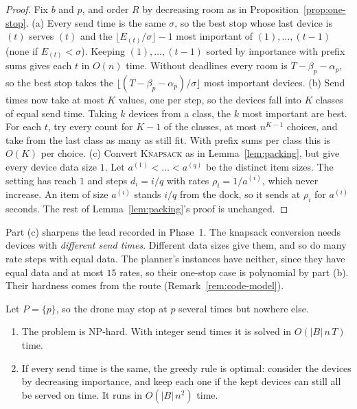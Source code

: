 \begin{proof}
Fix $b$ and $p$, and order $R$ by decreasing room as in
Proposition~\ref{prop:one-stop}. (a) Every send time is the same $\sigma$,
so the best stop whose last device is $(t)$ serves $(t)$ and the
$\lfloor E_{(t)}/\sigma\rfloor-1$ most important of $(1),\dots,(t-1)$ (none
if $E_{(t)}<\sigma$). Keeping $(1),\dots,(t-1)$ sorted by importance with
prefix sums gives each $t$ in $O(n)$ time. Without deadlines every room is
$T-\beta_p-\alpha_p$, so the best stop takes the
$\lfloor(T-\beta_p-\alpha_p)/\sigma\rfloor$ most important devices.
(b) Send times now take at most $K$ values, one per step, so the devices
fall into $K$ classes of equal send time. Taking $k$ devices from a class,
the $k$ most important are best. For each $t$, try every count for $K-1$
of the classes, at most $n^{K-1}$ choices, and take from the last class as
many as still fit. With prefix sums per class this is $O(K)$ per choice.
(c) Convert \textsc{Knapsack} as in Lemma~\ref{lem:packing}, but give every
device data size $1$. Let $a^{(1)}<\dots<a^{(q)}$ be the distinct item
sizes. The setting has reach $1$ and steps $d_i=i/q$ with rates
$\rho_i=1/a^{(i)}$, which never increase. An item of size $a^{(i)}$ stands
$i/q$ from the dock, so it sends at $\rho_i$ for $a^{(i)}$ seconds. The rest
of Lemma~\ref{lem:packing}'s proof is unchanged.
\end{proof}

Part (c) sharpens the lead recorded in Phase~1. The knapsack conversion
needs devices with \emph{different send times}. Different data sizes give
them, and so do many rate steps with equal data. The planner's instances
have neither, since they have equal data and at most $15$ rates, so their
one-stop case is polynomial by part (b). Their hardness comes from the
route (Remark~\ref{rem:code-model}).

\begin{proposition}
\label{prop:one-site}
Let $P=\{p\}$, so the drone may stop at $p$ several times but nowhere else.
\begin{enumerate}
  \item[(a)] The problem is NP-hard. With integer send times it is solved
    in $O(|B|\,n\,T)$ time.
  \item[(b)] If every send time is the same, the greedy rule is optimal:
    consider the devices by decreasing importance, and keep each one if the
    kept devices can still all be served on time. It runs in $O(|B|\,n^2)$
    time.
\end{enumerate}
\end{proposition}

